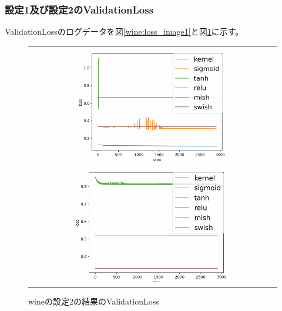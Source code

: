 \subsubsection{設定1及び設定2のValidationLoss}
\label{wine:loss}

ValidationLossのログデータを図\ref{wine:loss_image1}と図\ref{wine:loss_image2}に示す。

\begin{figure}[hbtp]
    \begin{center}
        \begin{tabular}{c}
            \begin{minipage}{0.5\hsize}
                \includegraphics[clip, width=7cm]{asset/wine_0.001_3000_3_015_sgd_non_kaiming_uniform.png}
                    \caption{wineの設定1の結果のValidationLoss}
                     \label{wine:loss_image1}
            \end{minipage}
            \hspace{10pt}
            \begin{minipage}{0.5\hsize}
                \includegraphics[clip, width=7cm]{asset/wine_0.001_3000_3_015_adam_non_kaiming_uniform}
                    \caption{wineの設定2の結果のValidationLoss}
                     \label{wine:loss_image2}
            \end{minipage}
        \end{tabular}
    \end{center}
\end{figure}


